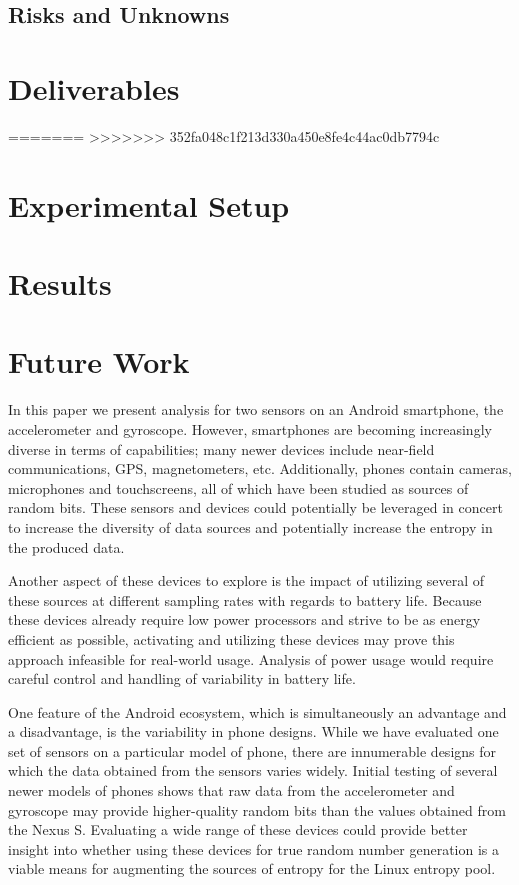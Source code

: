 \documentclass[conference]{IEEEtran}
\begin{document}
\subsection{Risks and Unknowns}


\section{Deliverables}


=======
>>>>>>> 352fa048c1f213d330a450e8fe4c44ac0db7794c
\section{Experimental Setup}


\section{Results}

\section{Future Work}
In this paper we present analysis for two sensors on an Android smartphone,
the accelerometer and gyroscope.  However, smartphones are becoming
increasingly diverse in terms of capabilities; many newer devices include
near-field communications, GPS, magnetometers, etc.  Additionally, phones
contain cameras, microphones and touchscreens, all of which have been studied
as sources of random bits.  These sensors and devices could potentially be
leveraged in concert to increase the diversity of data sources and potentially
increase the entropy in the produced data.

Another aspect of these devices to explore is the impact of utilizing several
of these sources at different sampling rates with regards to battery life.
Because these devices already require low power processors and strive to be
as energy efficient as possible, activating and utilizing these devices may
prove this approach infeasible for real-world usage.  Analysis of power usage
would require careful control and handling of variability in battery life.

One feature of the Android ecosystem, which is simultaneously an advantage and
a disadvantage, is the variability in phone designs.  While we have evaluated
one set of sensors on a particular model of phone, there are
innumerable designs for which the data obtained from the sensors varies widely.
Initial testing of several newer models of phones shows that raw data from the
accelerometer and gyroscope may provide higher-quality random bits than
the values obtained from the Nexus S.  Evaluating a wide range of these devices
could provide better insight into whether using these devices for true random
number generation is a viable means for augmenting the sources of entropy for
the Linux entropy pool.
\end{document}
